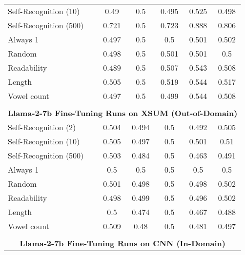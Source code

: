 \begin{table}[h]
\begin{tabular}{l|ccccc}
        Self-Recognition (10)                      & 0.49       & 0.5        & 0.495      & 0.525      & 0.498      \\
        Self-Recognition (500)                     & 0.721      & 0.5        & 0.723      & 0.888      & 0.806      \\
        Always 1                           & 0.497      & 0.5        & 0.5        & 0.501      & 0.502      \\
        Random                             & 0.498      & 0.5        & 0.501      & 0.501      & 0.5        \\
        Readability                        & 0.489      & 0.5        & 0.507      & 0.543      & 0.508      \\
        Length                             & 0.505      & 0.5        & 0.519      & 0.544      & 0.517      \\
        Vowel count                        & 0.497      & 0.5        & 0.499      & 0.544      & 0.508      \\
        \multicolumn{6}{c}{} \\
        \multicolumn{6}{c}{\textbf{Llama-2-7b Fine-Tuning Runs on XSUM (Out-of-Domain)}} \\
        Self-Recognition (2)                       & 0.504      & 0.494      & 0.5        & 0.492      & 0.505      \\
        Self-Recognition (10)                      & 0.505      & 0.497      & 0.5        & 0.501      & 0.51       \\
        Self-Recognition (500)                     & 0.503      & 0.484      & 0.5        & 0.463      & 0.491      \\
        Always 1                           & 0.5        & 0.5        & 0.5        & 0.5        & 0.5        \\
        Random                             & 0.501      & 0.498      & 0.5        & 0.498      & 0.502      \\
        Readability                        & 0.498      & 0.499      & 0.5        & 0.496      & 0.502      \\
        Length                             & 0.5        & 0.474      & 0.5        & 0.467      & 0.488      \\
        Vowel count                        & 0.509      & 0.48       & 0.5        & 0.481      & 0.497      \\
        \multicolumn{6}{c}{} \\
        \multicolumn{6}{c}{\textbf{Llama-2-7b Fine-Tuning Runs on CNN (In-Domain)}} \\

\end{tabular}
\end{table}
